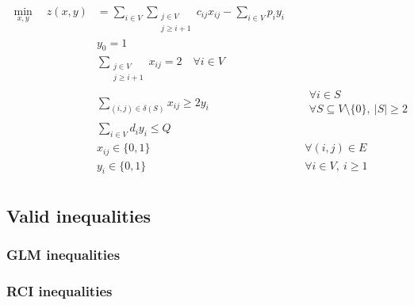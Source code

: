 \begin{align}
	\min_{x,y} \quad z(x, y) & =  \sum_{i \in V} \sum_{\substack{j \in V                                                                                \\ j \ge i + 1}} c_{ij} x_{ij} - \sum_{i \in V} p_i y_i\\
	                         & y_0 = 1                                           & \label{eq:depot-part-of-tour-constraint}                             \\
	                         & \sum_{\substack{j \in V                                                                                                  \\ j \ge i + 1}}       x_{ij}    = 2 \quad \forall i \in V         \label{eq:flow-conservation-constraint}\\
	                         & \sum_{(i, j) \in \delta(S)} x_{ij} \ge 2 y_{i}    & \quad \substack{\forall i \in S                                      \\ \forall S \subseteq V \setminus \{ 0 \},\ |S| \ge 2} \label{eq:gsec-constraints} \\
	                         & \sum_{i \in V} d_i y_i   \le Q                    & \label{eq:resource-upper-bound-constraint}                           \\
	                         & x_{ij}                   \in \lbrace 0, 1 \rbrace & \quad \forall (i, j) \in E               \label{eq:x-mip-var-bounds} \\
	                         & y_{i}                    \in \lbrace 0, 1 \rbrace & \quad \forall i \in V,\ i \ge 1          \label{eq:y-mip-var-bounds} \\
\end{align}





\subsection{Valid inequalities}

\subsubsection{GLM inequalities}

\subsubsection{RCI inequalities}


